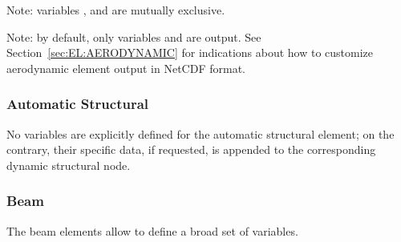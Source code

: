 Note: variables ,
and  are mutually exclusive.

Note: by default, only variables 
and  are output.
See Section~\ref{sec:EL:AERODYNAMIC} for indications
about how to customize aerodynamic element output in NetCDF format.


\subsubsection{Automatic Structural}
\label{sec:NetCDF:Elem:Automatic Structural}
No variables are explicitly defined for the automatic structural
element; on the contrary, their specific data, if requested,
is appended to the corresponding dynamic structural node.


\subsubsection{Beam}
\label{sec:NetCDF:Elem:Beam}

The beam elements allow to define a broad set of variables.

